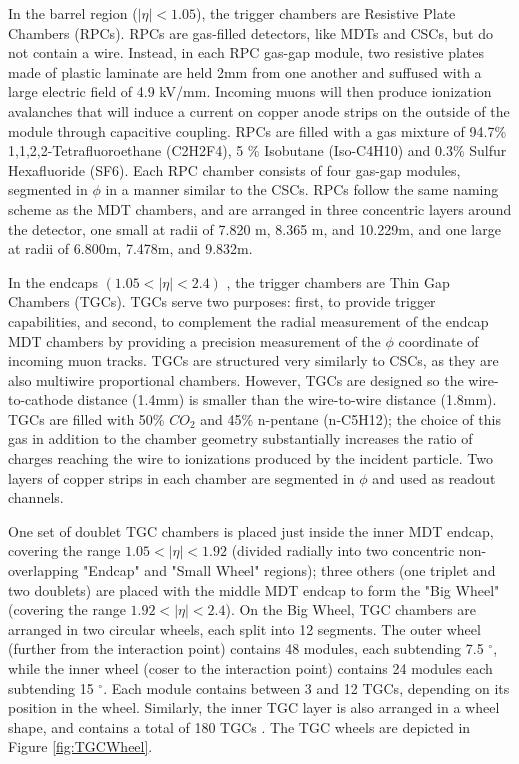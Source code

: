 In the barrel region ($| \eta | < 1.05 $), the trigger chambers are Resistive Plate Chambers (RPCs). RPCs are gas-filled detectors, like MDTs and CSCs, but do not contain a wire. Instead, in each RPC gas-gap module, two resistive plates made of plastic laminate are held 2mm from one another and suffused with a large electric field of 4.9 kV/mm. Incoming muons will then produce ionization avalanches that will induce a current on copper anode strips on the outside of the module through capacitive coupling. RPCs are filled with a gas mixture of 94.7\% 1,1,2,2-Tetrafluoroethane (C2H2F4), 5 \% Isobutane (Iso-C4H10) and 0.3\% Sulfur Hexafluoride (SF6). Each RPC chamber consists of four gas-gap modules, segmented in $\phi$ in a manner similar to the CSCs. RPCs follow the same naming scheme as the MDT chambers, and are arranged in three concentric layers around the detector, one small at radii of 7.820 m, 8.365 m, and 10.229m, and one large at radii of 6.800m, 7.478m, and 9.832m.

In the endcaps $(1.05 <|\eta| < 2.4)$ , the trigger chambers are Thin Gap Chambers (TGCs). TGCs serve two purposes: first, to provide trigger capabilities, and second, to complement the radial measurement of the endcap MDT chambers by providing a precision measurement of the $\phi$ coordinate of incoming muon tracks. TGCs are structured very similarly to CSCs, as they are also multiwire proportional chambers. However, TGCs are designed so the wire-to-cathode distance (1.4mm) is smaller than the wire-to-wire distance (1.8mm). TGCs are filled with 50\% $CO_2$ and 45\% n-pentane (n-C5H12); the choice of this gas in addition to the chamber geometry substantially increases the ratio of charges reaching the wire to ionizations produced by the incident particle. Two layers of copper strips in each chamber are segmented in $\phi$ and used as readout channels.

One set of doublet TGC chambers is placed just inside the inner MDT endcap, covering the range $ 1.05 < |\eta| <1.92 $ (divided radially into two concentric non-overlapping "Endcap" and "Small Wheel" regions); three others (one triplet and two doublets) are placed with the middle MDT endcap to form the "Big Wheel" (covering the range $ 1.92 < |\eta| < 2.4$). On the Big Wheel, TGC chambers are arranged in two circular wheels, each split into 12 segments. The outer wheel (further from the interaction point) contains 48 modules, each subtending 7.5 $^{\circ}$, while the inner wheel (coser to the interaction point) contains 24 modules each subtending 15 $^{\circ}$. Each module contains between 3 and 12 TGCs, depending on its position in the wheel. Similarly, the inner TGC layer is also arranged in a wheel shape, and contains a total of 180 TGCs \cite{ATLAS_Jinst}. The TGC wheels are depicted in Figure \ref{fig:TGCWheel}.

